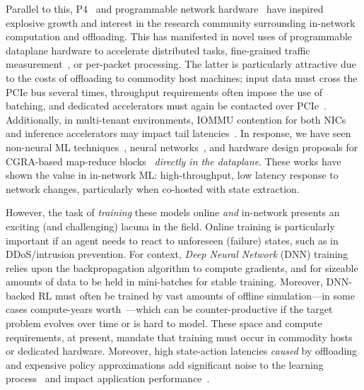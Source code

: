 \documentclass[sigconf,natbib=false]{acmart}
\begin{document}
Parallel to this, P4~\parencite{DBLP:journals/ccr/BosshartDGIMRSTVVW14} and programmable network hardware~\parencite{DBLP:journals/micro/ZilbermanACM14, netronome-smartnic, xilinx-alveo, barefoot-intel} have inspired explosive growth and interest in the research community surrounding in-network computation and offloading.
This has manifested in novel uses of programmable dataplane hardware to accelerate distributed tasks, fine-grained traffic measurement~\parencite{DBLP:conf/sigcomm/GuptaHCFRW18,DBLP:conf/sigcomm/ChenFKRR18,DBLP:conf/sosr/GhasemiBR17}, or per-packet processing.
The latter is particularly attractive due to the costs of offloading to commodity host machines; input data must cross the PCIe bus several times, throughput requirements often impose the use of batching, and dedicated accelerators must again be contacted over PCIe~\parencite{DBLP:journals/corr/abs-2009-02353}.
Additionally, in multi-tenant environments, IOMMU contention for both NICs and inference accelerators may impact tail latencies~\parencite{DBLP:conf/sigcomm/NeugebauerAZAL018}.
In response, we have seen non-neural ML techniques~\parencite{DBLP:conf/hotnets/XiongZ19}, neural networks~\parencite{DBLP:conf/sigcomm/SanvitoSB18,DBLP:journals/corr/abs-1801-05731,DBLP:journals/corr/abs-2009-02353,langlet-ml-netronome}, and hardware design proposals for CGRA-based map-reduce blocks~\parencite{DBLP:journals/corr/abs-2002-08987} \emph{directly in the dataplane}.
These works have shown the value in in-network ML: high-throughput, low latency response to network changes, particularly when co-hosted with state extraction.

However, the task of \emph{training} these models online \emph{and} in-network presents an exciting (and challenging) lacuna in the field.
Online training is particularly important if an agent needs to react to unforeseen (failure) states, such as in DDoS/intrusion prevention.
For context, \emph{Deep Neural Network} (DNN) training relies upon the backpropagation algorithm to compute gradients, and for sizeable amounts of data to be held in mini-batches for stable training.
Moreover, DNN-backed RL must often be trained by vast amounts of offline simulation---in some cases compute-years worth~\parencite{DBLP:journals/corr/abs-1912-06680}---which can be counter-productive if the target problem evolves over time or is hard to model.
These space and compute requirements, at present, mandate that training must occur in commodity hosts or dedicated hardware.
Moreover, high state-action latencies \emph{caused} by offloading and expensive policy approximations add significant noise to the learning process~\parencite{DBLP:journals/firai/TravnikMSP18} and impact application performance~\parencite{DBLP:journals/corr/abs-1910-04054}.
\end{document}
